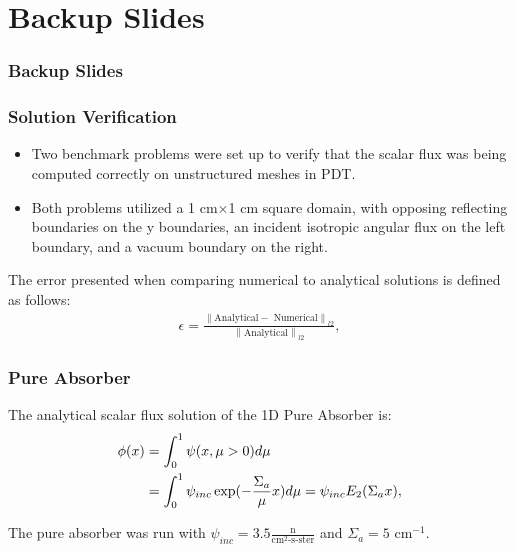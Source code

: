 \documentclass[compress]{beamer}
\newcommand{\norm}[1]{\left\lVert#1\right\rVert}
\newcommand{\backupbegin}{
   \newcounter{finalframe}
   \setcounter{finalframe}{\value{framenumber}}
}
\begin{document}
\backupbegin
\appendix
\section{Backup Slides}
\begin{frame}[t]\frametitle{Backup Slides}

\end{frame}

\begin{frame}[t]\frametitle{Solution Verification}
\begin{block}{}
\begin{itemize}
\item Two benchmark problems were set up to verify that the scalar flux was being computed correctly on unstructured meshes in PDT.
\item Both problems utilized a 1 cm$\times$1 cm square domain, with opposing reflecting boundaries on the y boundaries, an incident isotropic angular flux on the left boundary, and a vacuum boundary on the right.
\end{itemize}
\end{block}
\begin{block}{}
The error presented when comparing numerical to analytical solutions is defined as follows:
\begin{align*}
\epsilon = \frac{\norm{\text{Analytical} - \text{ Numerical}}_{l2}}{\norm{\text{Analytical}}_{l2}},
\end{align*}
\end{block}
\end{frame}

\begin{frame}[t]\frametitle{Pure Absorber}
\begin{block}{}
The analytical scalar flux solution of the 1D Pure Absorber is:
\begin{align*}
\phi(x) &= \int_{0}^{1}\psi(x,\mu>0) d\mu \notag \\
&= \int_{0}^{1}\psi_{inc}\exp(-\frac{\Sigma_a}{\mu} x) d\mu = \psi_{inc} E_{2}(\Sigma_a x),
\end{align*}
\end{block}
\begin{block}{}
The pure absorber was run with $\psi_{inc} = 3.5 \frac{\text{n}}{\text{cm}^2\text{-s-ster}}$ and $\Sigma_a = 5 \text{ cm}^{-1}$.
\end{block}
\end{frame}
\end{document}
